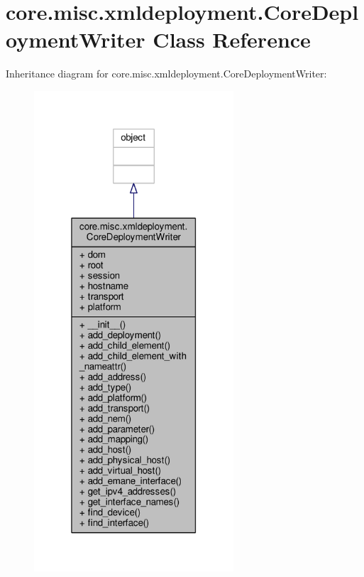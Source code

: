 \hypertarget{classcore_1_1misc_1_1xmldeployment_1_1_core_deployment_writer}{\section{core.\+misc.\+xmldeployment.\+Core\+Deployment\+Writer Class Reference}
\label{classcore_1_1misc_1_1xmldeployment_1_1_core_deployment_writer}
}


Inheritance diagram for core.\+misc.\+xmldeployment.\+Core\+Deployment\+Writer\+:
\nopagebreak
\begin{figure}[H]
\begin{center}
\leavevmode
\includegraphics[width=211pt]{classcore_1_1misc_1_1xmldeployment_1_1_core_deployment_writer__inherit__graph}
\end{center}
\end{figure}


